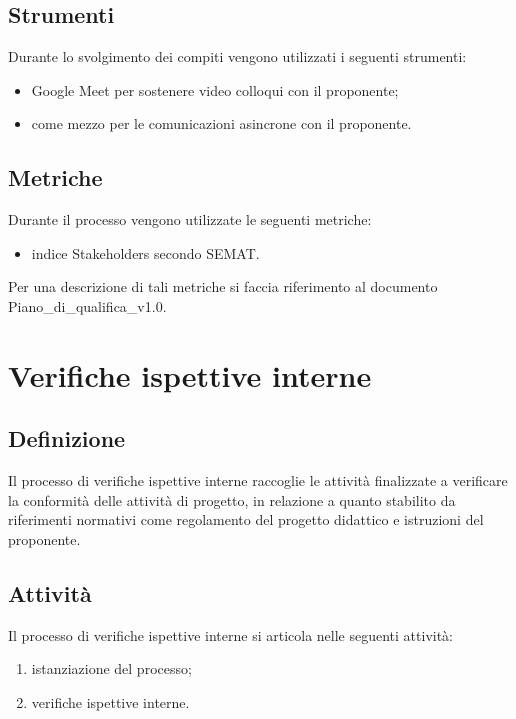 \subsection{Strumenti}
Durante lo svolgimento dei compiti vengono utilizzati i seguenti strumenti:
\begin{itemize}
    \item Google Meet per sostenere video colloqui con il proponente;
    \item {} come mezzo per le comunicazioni asincrone con il proponente.
\end{itemize}

\subsection{Metriche}
Durante il processo vengono utilizzate le seguenti metriche:
\begin{itemize}
    \item indice Stakeholders secondo SEMAT.
\end{itemize}
Per una descrizione di tali metriche si faccia riferimento al documento Piano\_di\_qualifica\_v1.0.
\newpage

\section{Verifiche ispettive interne} \label{sec:verificheispettive}
\subsection{Definizione}
Il processo di verifiche ispettive interne raccoglie le attività finalizzate a verificare la conformità delle attività di progetto, in relazione a quanto stabilito da riferimenti normativi come regolamento del progetto didattico e istruzioni del proponente.
\subsection{Attività}
Il processo di verifiche ispettive interne si articola nelle seguenti attività:
\begin{enumerate}
    \item istanziazione del processo;
    \item verifiche ispettive interne.
\end{enumerate}
